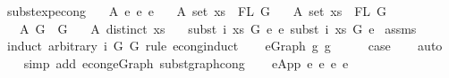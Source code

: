 \begin{isabellebody}
\isamarkupfalse%
%
\endisatagproof
{\isafoldproof}%
%
\isadelimproof
\isanewline
%
\endisadelimproof
\isanewline
\isanewline
{}\isamarkupfalse%
\ subst{\isacharunderscore}{\kern0pt}exp{\isacharunderscore}{\kern0pt}econg{}{\isacharcolon}{\kern0pt}\isanewline
\ \ \ A{}{\isacharcolon}{\kern0pt}\ {\isachardoublequoteopen}e{}\ {\isasymsimeq}e\ e{}{\isachardoublequoteclose}\isanewline
\ \ \ A{}{\isacharcolon}{\kern0pt}\ {\isachardoublequoteopen}set\ xs\ {\isacharequal}{\kern0pt}\ FL\ G{}{\isachardoublequoteclose}\isanewline
\ \ \ A{}{\isacharcolon}{\kern0pt}\ {\isachardoublequoteopen}set\ xs\ {\isacharequal}{\kern0pt}\ FL\ G{}{\isachardoublequoteclose}\isanewline
\ \ \ A{}{\isacharcolon}{\kern0pt}\ {\isachardoublequoteopen}G{}\ {\isasymsimeq}\ G{}{\isachardoublequoteclose}\isanewline
\ \ \ A{}{\isacharcolon}{\kern0pt}\ {\isachardoublequoteopen}distinct\ xs{\isachardoublequoteclose}\isanewline
\ \ \ {\isachardoublequoteopen}subst\ i\ xs\ G{}\ e{}\ {\isasymsimeq}e\ subst\ i\ xs\ G{}\ e{}{\isachardoublequoteclose}\isanewline
%
\isadelimproof
%
\endisadelimproof
%
\isatagproof
{}\isamarkupfalse%
\ assms\isanewline
{}\isamarkupfalse%
\ {\isacharparenleft}{\kern0pt}induct\ arbitrary{\isacharcolon}{\kern0pt}\ i\ G{}\ G{}\ rule{\isacharcolon}{\kern0pt}\ econg{\isachardot}{\kern0pt}induct{\isacharparenright}{\kern0pt}\isanewline
\ \ \isamarkupfalse%
\ {\isacharparenleft}{\kern0pt}e{\isacharunderscore}{\kern0pt}Graph\ g\ g{\isacharprime}{\kern0pt}{\isacharparenright}{\kern0pt}\isanewline
\ \ \isamarkupfalse%
\ \isamarkupfalse%
\ {\isacharquery}{\kern0pt}case\isanewline
\ \ \isamarkupfalse%
\ auto\isanewline
\ \ \isamarkupfalse%
\ {\isacharparenleft}{\kern0pt}simp\ add{\isacharcolon}{\kern0pt}\ econg{\isachardot}{\kern0pt}e{\isacharunderscore}{\kern0pt}Graph\ subst{\isacharunderscore}{\kern0pt}graph{\isacharunderscore}{\kern0pt}cong{}{\isacharparenright}{\kern0pt}\isanewline
{}\isamarkupfalse%
\isanewline
\ \ \isamarkupfalse%
\ {\isacharparenleft}{\kern0pt}e{\isacharunderscore}{\kern0pt}App\ e{}\ e{}{\isacharprime}{\kern0pt}\ e{}\ e{}{\isacharprime}{\kern0pt}{\isacharparenright}{\kern0pt}\isanewline

\end{isabellebody}
